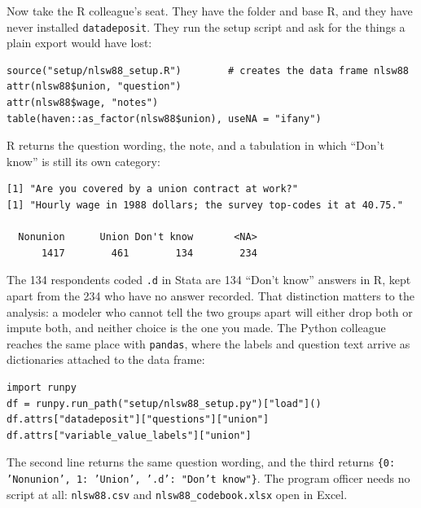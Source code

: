 Now take the R colleague's seat. They have the folder and base R, and they have never installed \texttt{datadeposit}. They run the setup script and ask for the things a plain export would have lost:
\par
{\footnotesize
\begin{verbatim}
source("setup/nlsw88_setup.R")        # creates the data frame nlsw88
attr(nlsw88$union, "question")
attr(nlsw88$wage, "notes")
table(haven::as_factor(nlsw88$union), useNA = "ifany")
\end{verbatim}
}
R returns the question wording, the note, and a tabulation in which \enquote{Don't know} is still its own category:
\par
{\footnotesize
\begin{verbatim}
[1] "Are you covered by a union contract at work?"
[1] "Hourly wage in 1988 dollars; the survey top-codes it at 40.75."

  Nonunion      Union Don't know       <NA>
      1417        461        134        234
\end{verbatim}
}
The 134 respondents coded \texttt{.d} in Stata are 134 \enquote{Don't know} answers in R, kept apart from the 234 who have no answer recorded. That distinction matters to the analysis: a modeler who cannot tell the two groups apart will either drop both or impute both, and neither choice is the one you made. The Python colleague reaches the same place with \texttt{pandas}, where the labels and question text arrive as dictionaries attached to the data frame:
\par
{\footnotesize
\begin{verbatim}
import runpy
df = runpy.run_path("setup/nlsw88_setup.py")["load"]()
df.attrs["datadeposit"]["questions"]["union"]
df.attrs["variable_value_labels"]["union"]
\end{verbatim}
}
The second line returns the same question wording, and the third returns \texttt{\{0: 'Nonunion', 1: 'Union', '.d': "Don't know"\}}. The program officer needs no script at all: \texttt{nlsw88.csv} and \texttt{nlsw88\_codebook.xlsx} open in Excel.

